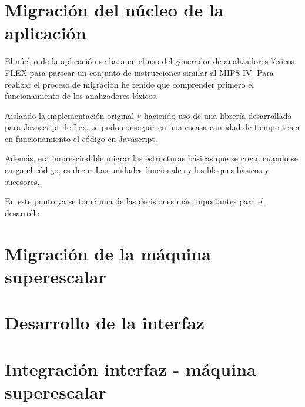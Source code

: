 

\section{Migración del núcleo de la aplicación}
\label{5:sec1} 

El núcleo de la aplicación se basa en el uso del generador de analizadores léxicos FLEX para parsear
un conjunto de instrucciones similar al MIPS IV. Para realizar el proceso de migración he tenido que comprender primero el funcionamiento de los analizadores léxicos.

Aislando la implementación original y haciendo uso de una librería desarrollada para Javascript de Lex,
se pudo conseguir en una escasa cantidad de tiempo tener en funcionamiento el código en Javascript.

Además, era imprescindible migrar las estructuras básicas que se crean cuando se carga el código, 
es decir: Las unidades funcionales y los bloques básicos y sucesores.

En este punto ya se tomó una de las decisiones más importantes para el desarrollo. 


\section{Migración de la máquina superescalar}
\label{5:sec2} 



\section{Desarrollo de la interfaz}
\label{5:sec3} 

\section{Integración interfaz - máquina superescalar}
\label{5:sec3} 


